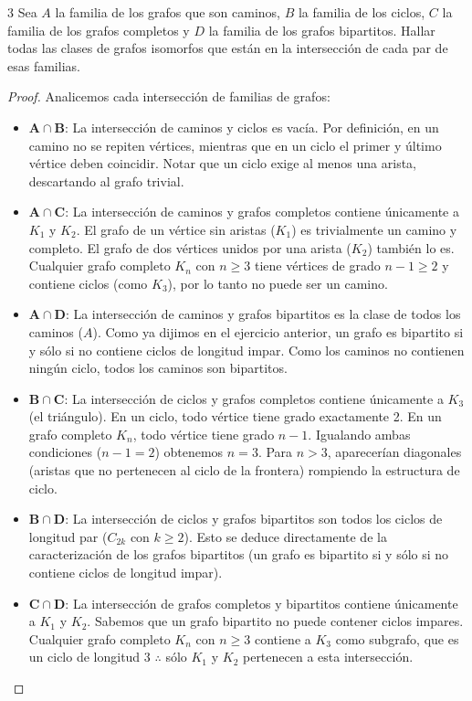\begin{ejercicio}{3}
    Sea \( A \) la familia de los grafos que son caminos, \( B \) la familia de los ciclos, \( C \) la familia de los grafos completos y \( D \) la familia de los grafos bipartitos. Hallar todas las clases de grafos isomorfos que están en la intersección de cada par de esas familias.
\end{ejercicio}
\begin{proof}
    Analicemos cada intersección de familias de grafos:
    \begin{itemize}
        \item \(\mathbf{A \cap B}\): La intersección de caminos y ciclos es vacía. Por definición, en un camino no se repiten vértices, mientras que en un ciclo el primer y último vértice deben coincidir. Notar que un ciclo exige al menos una arista, descartando al grafo trivial.

        \item \(\mathbf{A \cap C}\): La intersección de caminos y grafos completos contiene únicamente a \(K_1\) y \(K_2\). El grafo de un vértice sin aristas (\(K_1\)) es trivialmente un camino y completo. El grafo de dos vértices unidos por una arista (\(K_2\)) también lo es. Cualquier grafo completo \(K_n\) con \(n \geq 3\) tiene vértices de grado \(n-1 \geq 2\) y contiene ciclos (como \(K_3\)), por lo tanto no puede ser un camino.

        \item \(\mathbf{A \cap D}\): La intersección de caminos y grafos bipartitos es la clase de todos los caminos (\(A\)). Como ya dijimos en el ejercicio anterior, un grafo es bipartito si y sólo si no contiene ciclos de longitud impar. Como los caminos no contienen ningún ciclo, todos los caminos son bipartitos.

        \item \(\mathbf{B \cap C}\): La intersección de ciclos y grafos completos contiene únicamente a \(K_3\) (el triángulo). En un ciclo, todo vértice tiene grado exactamente 2. En un grafo completo \(K_n\), todo vértice tiene grado \(n-1\). Igualando ambas condiciones (\(n-1 = 2\)) obtenemos \(n = 3\). Para \(n > 3\), aparecerían diagonales (aristas que no pertenecen al ciclo de la frontera) rompiendo la estructura de ciclo.

        \item \(\mathbf{B \cap D}\): La intersección de ciclos y grafos bipartitos son todos los ciclos de longitud par (\(C_{2k}\) con \(k \geq 2\)). Esto se deduce directamente de la caracterización de los grafos bipartitos (un grafo es bipartito si y sólo si no contiene ciclos de longitud impar).

        \item \(\mathbf{C \cap D}\): La intersección de grafos completos y bipartitos contiene únicamente a \(K_1\) y \(K_2\). Sabemos que un grafo bipartito no puede contener ciclos impares. Cualquier grafo completo \(K_n\) con \(n \geq 3\) contiene a \(K_3\) como subgrafo, que es un ciclo de longitud 3 \( \therefore \) sólo \(K_1\) y \(K_2\) pertenecen a esta intersección.
    \end{itemize}
\end{proof}

